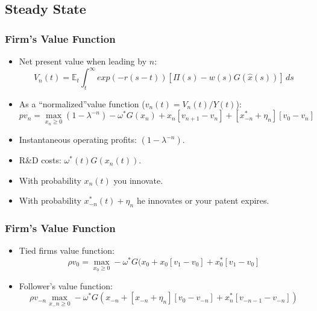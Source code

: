\documentclass{beamer}
\begin{document}
\subsection{Steady State}
\label{sub:steady_state}
\begin{frame}[t]\frametitle{Firm's Value Function} 
  \begin{itemize}
    \item<+-> Net present value when leading by $n$:
      \begin{equation*}
        V_n(t) = \mathbb{E}_t \int_{t}^{\infty} exp(-r(s - t))[\Pi(s) - w(s)G(\hat{x}(s))]\,ds 
      \end{equation*}
    \item<+-> As a ``normalized''value function ($v_n(t) = V_n(t) / Y(t)$):
      \begin{equation*} \label{eq:rvf_leader}  %
          pv_n = \max_{x_n \geq 0} (1 - \lambda^{-n}) - \omega^*G(x_n) + x_n[v_{n+1} - v_n] + [x_{-n}^* + \eta_n][v_0 - v_n]
        \end{equation*}
    \item<+-> Instantaneous operating profits: $(1 - \lambda^{-n})$.
    \item<+-> R\&D costs: $\omega^*(t)G(x_n(t))$.
    \item<+-> With probability $x_n(t)$ you innovate.
    \item<+-> With probability $x_{-n}^*(t) + \eta_n$ he innovates or your patent expires.
  \end{itemize}
\end{frame}

\begin{frame}[t]\frametitle{Firm's Value Function} 
  \begin{itemize}
    \item<+-> Tied firms value function:
      \begin{equation*} \label{eq:rvf_tied}
        \rho v_0 = \max_{x_0 \geq 0} -\omega^*G(x_{0} + x_{0}[v_1 - v_0] + x_0^*[v_{1} - v_0]
      \end{equation*}

    \item<+-> Follower's value function:
      \begin{equation*} \label{eq:rvf_follower}
        \rho v_{-n} \max_{x_-n \geq 0} -\omega^*G(x_{-n} + [x_{-n} + \eta_n][v_0 - v_{-n}] + x_n^*[v_{-n-1} - v_{-n}])
      \end{equation*}
  \end{itemize}
\end{frame}
\end{document}
